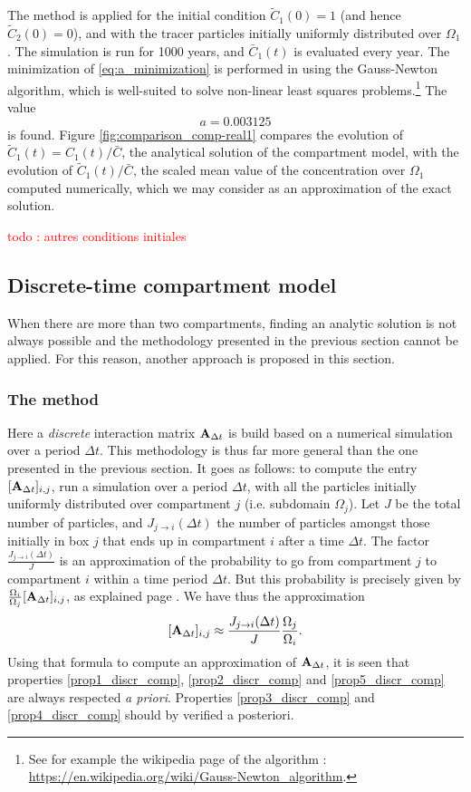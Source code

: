 The method is applied for the initial condition $\tilde C_1(0) = 1$ (and hence $\tilde C_2(0) = 0$), and with the tracer particles initially uniformly distributed over $\Omega_1$. The simulation is run for 1000 years, and $\bar C_1(t)$ is evaluated every year. The minimization of \eqref{eq:a_minimization} is performed in \matlab using the Gauss-Newton algorithm, which is well-suited to solve non-linear least squares problems.\footnote{See for example the wikipedia page of the algorithm : \url{https://en.wikipedia.org/wiki/Gauss-Newton_algorithm}.} The value 
\begin{equation}
	a = 0.003125
\end{equation}
is found. Figure \ref{fig:comparison_comp-real1} compares the evolution of $\tilde C_1(t) = C_1(t)/\bar C$, the analytical solution of the compartment model, with the evolution of $\tilde C_1(t)/\bar C$, the scaled mean value of the concentration over $\Omega_1$ computed numerically, which we may consider as an approximation of the exact solution.

\textcolor{red}{todo : autres conditions initiales}

\subsection{Discrete-time compartment model} \label{sec:dtcm}
When there are more than two compartments, finding an analytic solution is not always possible and the methodology presented in the previous section cannot be applied. For this reason, another approach is proposed in this section. 
\subsubsection{The method}
Here a \textit{discrete} interaction matrix $\mathbf A_{\Delta t}$ is build based on a numerical simulation over a period $\Delta t$. This methodology is thus far more general than the one presented in the previous section. It goes as follows: to compute the entry $[\mathbf A_{\Delta t}]_{i,j}$, run a simulation over a period $\Delta t$, with all the particles initially uniformly distributed over compartment $j$ (i.e. subdomain $\Omega_j$). Let $J$ be the total number of particles, and $J_{j \rightarrow i}(\Delta t)$ the number of particles amongst those initially in box $j$ that ends up in compartment $i$ after a time $\Delta t$. The factor $\frac{J_{j \rightarrow i}(\Delta t)}{J}$ is an approximation of the probability to go from compartment $j$ to compartment $i$ within a time period $\Delta t$. But this probability is precisely given by $\frac{\Omega_i}{\Omega_j}[\mathbf A_{\Delta t}]_{i,j}$, as explained page \pageref{page:probability_interpretation}. We have thus the approximation
\begin{equation} \label{eq:A_approx_discr}
	[\mathbf A_{\Delta t}]_{i,j} \approx \frac{J_{j \rightarrow i}(\Delta t)}{J}\frac{\Omega_j}{\Omega_i}.
\end{equation}
Using that formula to compute an approximation of $\mathbf A_{\Delta t}$, it is seen that properties \ref{prop1_discr_comp}, \ref{prop2_discr_comp} and \ref{prop5_discr_comp} are always respected \textit{a priori}. Properties \ref{prop3_discr_comp} and \ref{prop4_discr_comp} should by verified a posteriori.
